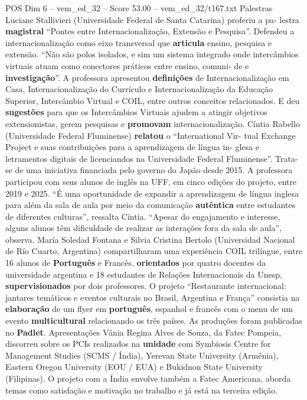 \begin{textsample}{POS Dim 6 – vem\_ed\_32 – Score 53.00 – vem\_ed\_32/t167.txt}
Palestras Luciane Stallivieri (Universidade Federal de Santa Catarina) proferiu a pa- lestra \textbf{magistral} “Pontes entre Internacionalização, Extensão e Pesquisa”.
Defendeu a internacionalização como eixo transversal que \textbf{articula} ensino, pesquisa e extensão. “Não são polos isolados, e sim um sistema integrado onde intercâmbios virtuais atuam como conectores práticos entre ensino, comuni- de e \textbf{investigação}”.
A professora apresentou \textbf{definições} de Internacionalização em Casa, Internacionalização do Currículo e Internacionalização da Educação Superior, Intercâmbio Virtual e COIL, entre outros conceitos relacionados.
E deu \textbf{sugestões} para que os Intercâmbios Virtuais ajudem a atingir objetivos extensionistas, gerem pesquisas e \textbf{promovam} internacionalização.
Cíntia Rabello (Universidade Federal Fluminense) \textbf{relatou} o “International Vir- tual Exchange Project e suas contribuições para a aprendizagem de língua in- glesa e letramentos digitais de licenciandos na Universidade Federal Fluminense”.
Trata-se de uma iniciativa financiada pelo governo do Japão desde 2015.
A professora participou com seus alunos de inglês na UFF, em cinco edições do projeto, entre 2019 e 2025. “É uma oportunidade de expandir a aprendizagem de língua inglesa para além da sala de aula por meio da comunicação \textbf{autêntica} entre estudantes de diferentes culturas”, ressalta Cíntia. “Apesar do engajamento e interesse, alguns alunos têm dificuldade de realizar as interações fora da sala de aula”, observa.
María Soledad Fontana e Silvia Cristina Bertolo (Universidad Nacional de Río Cuarto, Argentina) compartilharam uma experiência COIL trilíngue, entre 16 alunos de \textbf{Português} e Francês, \textbf{orientados} por quatro docentes da universidade argentina e 18 estudantes de Relações Internacionais da Unesp, \textbf{supervisionados} por dois professores.
O projeto “Restaurante internacional: jantares temáticos e eventos culturais no Brasil, Argentina e França” consistia na \textbf{elaboração} de um flyer em \textbf{português}, espanhol e francês com o menu de um evento \textbf{multicultural} relacionando os três países.
As produções foram publicadas no \textbf{Padlet}.
Apresentações Vânia Regina Alves de Souza, da Fatec Pompeia, discorreu sobre os PCIs realizados na \textbf{unidade} com Symbiosis Centre for Management Studies (SCMS / Índia), Yerevan State University (Armênia), Eastern Oregon University (EOU / EUA) e Bukidnon State University (Filipinas).
O projeto com a Índia envolve também a Fatec Americana, aborda temas como satisfação e motivação no trabalho e já está na terceira edição.

\end{textsample}
